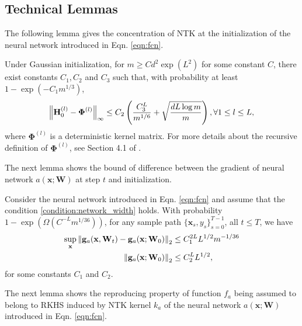 \subsection{Technical Lemmas}
The following lemma gives the concentration of NTK at the initialization of the neural network introduced in Eqn. \ref{eqn:fcn}.
\begin{lemma}
\label{lemma:neural_cbo_H_to_Phi}
Under Gaussian initialization, for $m \ge Cd^2 \exp(L^2)$ for some constant $C$, there exist constants $C_1, C_2$ and $C_3$ such that, with probability at least $1 - \exp (-C_1 m^{1/3})$,
\[
\norm{\mathbf{H}^{(l)}_0 - \boldsymbol{\Phi}^{(l)}}_\infty \le C_2 \left(\frac{C_3^L}{m^{1/6}} + \sqrt{\frac{dL\log m}{m}}\right), \forall 1\le l \le L,
\]
where $\boldsymbol{\Phi}^{(l)}$ is a deterministic kernel matrix. For more details about the recursive definition of $\boldsymbol{\Phi}^{(l)}$, see Section 4.1 of \citet{xu2024overparametrized}.
\end{lemma}
The next lemma shows the bound of difference between the gradient of neural network $a(\mathbf{x}; \mathbf{W})$ at step $t$ and initialization.
\begin{lemma} Consider the neural network introduced in Eqn. \ref{eqn:fcn} and assume that the condition \ref{condition:network_width} holds. With probability $1 - \exp (\Omega(C^{-L} m^{1/36}))$, for any sample path $\{ \mathbf{x}_s, y_s\}_{s=0}^{T-1}$, all $t\le T$, we have
\begin{align*}
\begin{split}
    \sup_\mathbf{x} \norm{\mathbf{g}_{a} (\mathbf{x}, \mathbf{W}_t) - \mathbf{g}_{a}(\mathbf{x}; \mathbf{W}_0)}_2 & \le C_1^{2L} L^{1/2}m^{-1/36}
    \\
    \norm{\mathbf{g}_{a}(\mathbf{x}; \mathbf{W}_0)}_2 &\le C_2^L L^{1/2}  ,
\end{split}    
\end{align*}
for some constants $C_1$ and $C_2$. 
\end{lemma}
The next lemma shows the reproducing property of function $f_a$ being assumed to belong to RKHS induced by NTK kernel $k_a$ of the neural network $a(\mathbf{x}; \mathbf{W})$ introduced in Eqn. \ref{eqn:fcn}.
